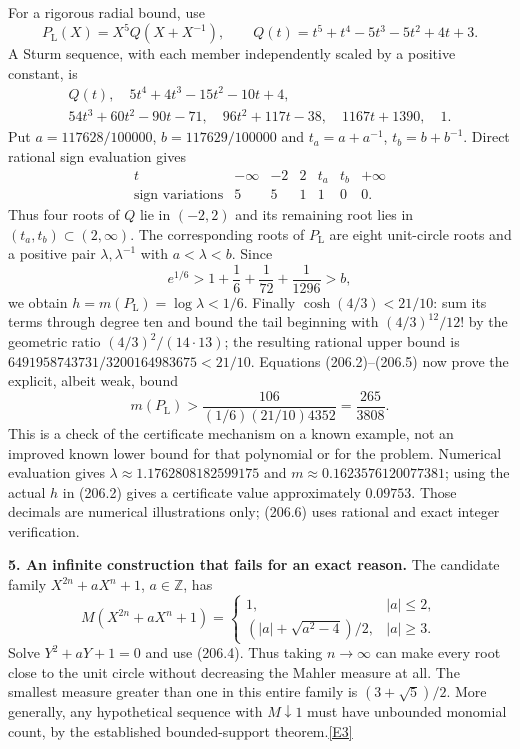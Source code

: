 \documentclass[11pt,a4paper]{article}
\newcommand{\Z}{\mathbb{Z}}
\newcommand{\eref}[2]{\hyperlink{extra:#1:#2}{[E#2]}}
\begin{document}
For a rigorous radial bound, use
\[
 P_\mathrm L(X)=X^5 Q(X+X^{-1}),\qquad
 Q(t)=t^5+t^4-5t^3-5t^2+4t+3.
\]
A Sturm sequence, with each member independently scaled by a positive
constant, is
\[
\begin{gathered}
 Q(t),\quad 5t^4+4t^3-15t^2-10t+4,\\
 54t^3+60t^2-90t-71,\quad96t^2+117t-38,
 \quad1167t+1390,\quad1.
\end{gathered}
\]
Put $a=117628/100000$, $b=117629/100000$ and
$t_a=a+a^{-1}$, $t_b=b+b^{-1}$. Direct rational sign evaluation gives
\[
\begin{array}{c|rrrrrr}
 t&-\infty&-2&2&t_a&t_b&+\infty\\\hline
 \text{sign variations}&5&5&1&1&0&0.
\end{array}
\]
Thus four roots of $Q$ lie in $(-2,2)$ and its remaining root lies in
$(t_a,t_b)\subset(2,\infty)$. The corresponding roots of $P_\mathrm L$
are eight unit-circle roots and a positive pair $\lambda,\lambda^{-1}$
with $a<\lambda<b$. Since
\[
 e^{1/6}>1+\frac16+\frac1{72}+\frac1{1296}>b,
\]
we obtain $h=m(P_\mathrm L)=\log\lambda<1/6$.
Finally $\cosh(4/3)<21/10$: sum its terms through degree ten and bound
the tail beginning with $(4/3)^{12}/12!$ by the geometric ratio
$(4/3)^2/(14\cdot13)$; the resulting rational upper bound is
$6491958743731/3200164983675<21/10$.
Equations (206.2)--(206.5) now prove the explicit, albeit weak, bound
\[
 m(P_\mathrm L)>\frac{106}{(1/6)(21/10)4352}
 =\frac{265}{3808}. \tag{206.6}
\]
This is a check of the certificate mechanism on a known example, not
an improved known lower bound for that polynomial or for the problem.
Numerical evaluation gives $\lambda\approx1.1762808182599175$ and
$m\approx0.1623576120077381$; using the actual $h$ in (206.2) gives a
certificate value approximately $0.09753$. Those decimals are numerical
illustrations only; (206.6) uses rational and exact integer verification.

\textbf{5. An infinite construction that fails for an exact reason.}
The candidate family $X^{2n}+aX^n+1$, $a\in\Z$, has
\[
 M(X^{2n}+aX^n+1)=
 \begin{cases}
 1,&|a|\le2,\\[2pt]
 (|a|+\sqrt{a^2-4})/2,&|a|\ge3.
 \end{cases}
\]
Solve $Y^2+aY+1=0$ and use (206.4). Thus taking $n\to\infty$ can
make every root close to the unit circle without decreasing the Mahler
measure at all. The smallest measure greater than one in this entire
family is $(3+\sqrt5)/2$. More generally, any hypothetical sequence
with $M\downarrow1$ must have unbounded monomial count, by the established
bounded-support theorem.\eref{statement}{3}
\end{document}
